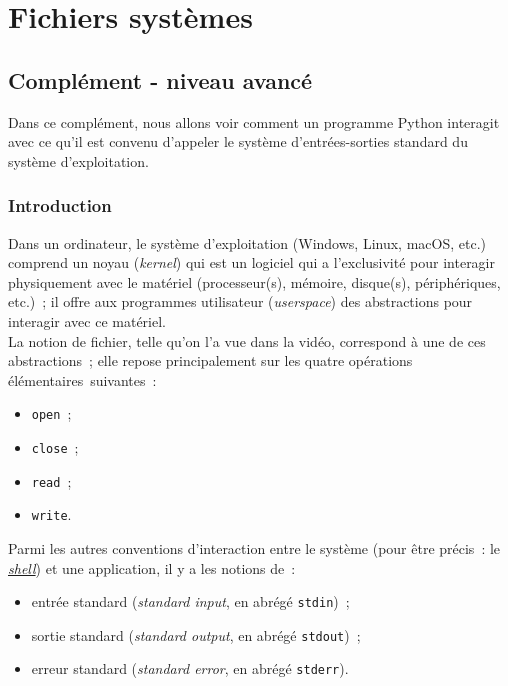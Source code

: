    \hypertarget{fichiers-systuxe8mes}{%
\section{Fichiers systèmes}\label{fichiers-systuxe8mes}}

    \hypertarget{compluxe9ment---niveau-avancuxe9}{%
\subsection{Complément - niveau
avancé}\label{compluxe9ment---niveau-avancuxe9}}

    Dans ce complément, nous allons voir comment un programme Python
interagit avec ce qu'il est convenu d'appeler le système
d'entrées-sorties standard du système d'exploitation.

    \hypertarget{introduction}{%
\subsubsection{Introduction}\label{introduction}}

    Dans un ordinateur, le système d'exploitation (Windows, Linux, macOS,
etc.) comprend un noyau (\emph{kernel}) qui est un logiciel qui a
l'exclusivité pour interagir physiquement avec le matériel
(processeur(s), mémoire, disque(s), périphériques, etc.)~; il offre aux
programmes utilisateur (\emph{userspace}) des abstractions pour
interagir avec ce matériel.\\

La notion de fichier, telle qu'on l'a vue dans la vidéo, correspond à
une de ces abstractions~; elle repose principalement sur les quatre
opérations élémentaires~suivantes~:

\begin{itemize}
	\item 
	\texttt{open}~;
	\item
	\texttt{close}~;
	\item
	\texttt{read}~;
	\item
	\texttt{write}.
\end{itemize}

    Parmi les autres conventions d'interaction entre le système (pour être
précis~: le
\href{http://fr.wikipedia.org/wiki/Interface_système}{\emph{shell}}) et
une application, il y a les notions de~:

\begin{itemize}
	\item 
	entrée standard	(\emph{standard input}, en abrégé \texttt{stdin})~;
	\item
	sortie standard (\emph{standard output}, en abrégé \texttt{stdout})~;
	\item
	erreur standard (\emph{standard error}, en abrégé \texttt{stderr}).
\end{itemize}

